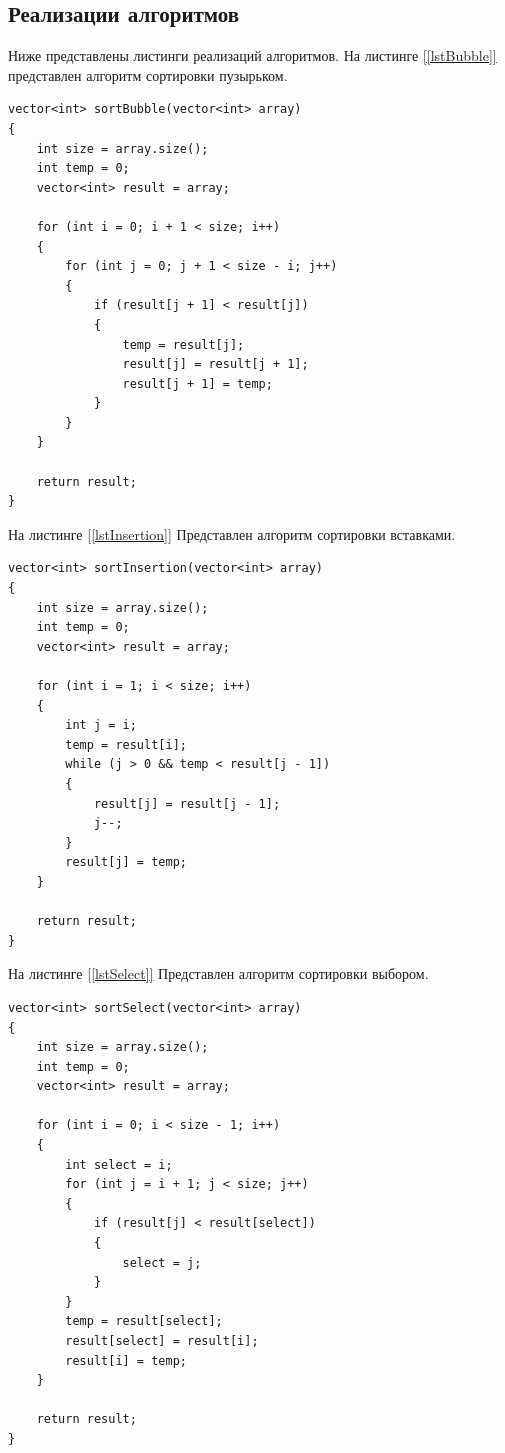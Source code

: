 \documentclass{article}
\begin{document}
	\subsection{Реализации алгоритмов}
	Ниже представлены листинги реализаций алгоритмов.
	На листинге \hyperref[lstBubble]{[\ref{lstBubble}]} представлен алгоритм сортировки пузырьком.
	\begin{lstlisting}[label=lstBubble, caption=Алгоритм сортировки пузырьком]
	vector<int> sortBubble(vector<int> array)
{
    int size = array.size();
    int temp = 0;
    vector<int> result = array;

    for (int i = 0; i + 1 < size; i++)
    {
        for (int j = 0; j + 1 < size - i; j++)
        {
            if (result[j + 1] < result[j])
            {
                temp = result[j];
                result[j] = result[j + 1];
                result[j + 1] = temp;
            }
        }
    }

    return result;
}
	\end{lstlisting}
		На листинге \hyperref[lstInsertion]{[\ref{lstInsertion}]} Представлен алгоритм сортировки вставками.
	\begin{lstlisting}[label=lstInsertion,caption=Алгоритм сортировки вставками]
	vector<int> sortInsertion(vector<int> array)
{
    int size = array.size();
    int temp = 0;
    vector<int> result = array;

    for (int i = 1; i < size; i++)
    {
        int j = i;
        temp = result[i];
        while (j > 0 && temp < result[j - 1])
        {
            result[j] = result[j - 1];
            j--;
        }
        result[j] = temp;
    }

    return result;
}
	\end{lstlisting}
		На листинге \hyperref[lstSelect]{[\ref{lstSelect}]} Представлен алгоритм сортировки выбором.
	\begin{lstlisting}[label=lstSelect,caption=Алгоритм сортировки выбором]
	vector<int> sortSelect(vector<int> array)
{
    int size = array.size();
    int temp = 0;
    vector<int> result = array;

    for (int i = 0; i < size - 1; i++)
    {
        int select = i;
        for (int j = i + 1; j < size; j++)
        {
            if (result[j] < result[select])
            {
                select = j;
            }
        }
        temp = result[select];
        result[select] = result[i];
        result[i] = temp;
    }

    return result;
}
	\end{lstlisting}
\end{document}
